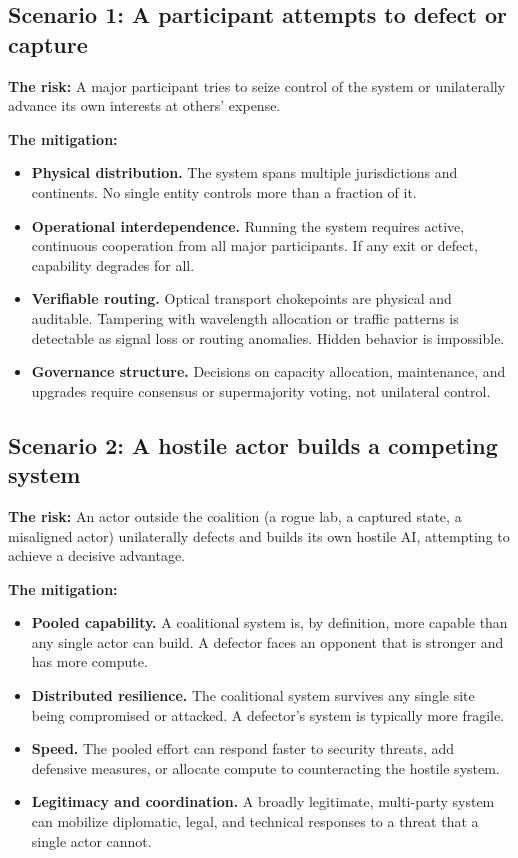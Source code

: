 \documentclass[12pt]{article}
\begin{document}
\subsection{Scenario 1: A participant attempts to defect or capture}

\textbf{The risk:} A major participant tries to seize control of the system or
unilaterally advance its own interests at others' expense.

\textbf{The mitigation:}
\begin{itemize}[leftmargin=1.6em,itemsep=2pt]
  \item \textbf{Physical distribution.} The system spans multiple jurisdictions
  and continents. No single entity controls more than a fraction of it.
  \item \textbf{Operational interdependence.} Running the system requires
  active, continuous cooperation from all major participants. If any exit or
  defect, capability degrades for all.
  \item \textbf{Verifiable routing.} Optical transport chokepoints are physical
  and auditable. Tampering with wavelength allocation or traffic patterns is
  detectable as signal loss or routing anomalies. Hidden behavior is impossible.
  \item \textbf{Governance structure.} Decisions on capacity allocation,
  maintenance, and upgrades require consensus or supermajority voting, not
  unilateral control.
\end{itemize}

\subsection{Scenario 2: A hostile actor builds a competing system}

\textbf{The risk:} An actor outside the coalition (a rogue lab, a captured
state, a misaligned actor) unilaterally defects and builds its own hostile AI,
attempting to achieve a decisive advantage.

\textbf{The mitigation:}
\begin{itemize}[leftmargin=1.6em,itemsep=2pt]
  \item \textbf{Pooled capability.} A coalitional system is, by definition, more
  capable than any single actor can build. A defector faces an opponent that is
  stronger and has more compute.
  \item \textbf{Distributed resilience.} The coalitional system survives any
  single site being compromised or attacked. A defector's system is typically
  more fragile.
  \item \textbf{Speed.} The pooled effort can respond faster to security
  threats, add defensive measures, or allocate compute to counteracting the
  hostile system.
  \item \textbf{Legitimacy and coordination.} A broadly legitimate, multi-party
  system can mobilize diplomatic, legal, and technical responses to a threat
  that a single actor cannot.
\end{itemize}
\end{document}
